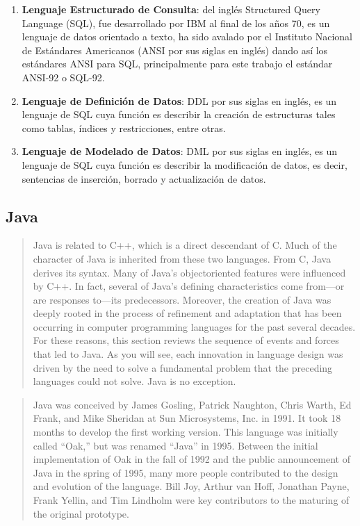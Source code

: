 \begin{enumerate}
	\item \textbf{Lenguaje Estructurado de Consulta}\label{sec-sql}: del inglés Structured Query Language (SQL), fue desarrollado por IBM\textsuperscript{\textcopyright} al final de los años 70, es un lenguaje de datos orientado a texto, ha sido avalado por el Instituto Nacional de Estándares Americanos (ANSI por sus siglas en inglés) dando así los estándares ANSI para SQL, principalmente para este trabajo el estándar ANSI-92 o SQL-92.
	\item \textbf{Lenguaje de Definición de Datos}: DDL por sus siglas en inglés, es un lenguaje de SQL cuya función es describir la creación de estructuras tales como tablas, índices y restricciones, entre otras\cite{DataBaseConcepts}.
	\item \textbf{Lenguaje de Modelado de Datos}: DML por sus siglas en inglés, es un lenguaje de SQL cuya función es describir la modificación de datos, es decir, sentencias de inserción, borrado y actualización de datos\cite{DataBaseConcepts}.  
\end{enumerate}

\iffalse
\subsection{Java}\label{sec-java}

\begin{quote}
	Java is related to C++, which is a direct descendant of C. Much of the character of Java is inherited from these two languages. From C, Java derives its syntax. Many of Java’s objectoriented features were influenced by C++. In fact, several of Java’s defining characteristics come from—or are responses to—its predecessors. Moreover, the creation of Java was deeply rooted in the process of refinement and adaptation that has been occurring in computer programming languages for the past several decades. For these reasons, this section reviews the sequence of events and forces that led to Java. As you will see, each innovation in language design was driven by the need to solve a fundamental problem that the preceding languages could not solve. Java is no exception\cite{JavaCompleteReference}.
\end{quote}

\begin{quote}
	Java was conceived by James Gosling, Patrick Naughton, Chris Warth, Ed Frank, and Mike Sheridan at Sun Microsystems, Inc. in 1991. It took 18 months to develop the first working version. This language was initially called “Oak,” but was renamed “Java” in 1995. Between the initial implementation of Oak in the fall of 1992 and the public announcement of Java in the spring of 1995, many more people contributed to the design and evolution of the language. Bill Joy, Arthur van Hoff, Jonathan Payne, Frank Yellin, and Tim Lindholm were key contributors to the maturing of the original prototype\cite{JavaCompleteReference}.
\end{quote}

